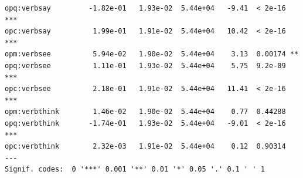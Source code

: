 \documentclass[10pt]{article}\usepackage[]{graphicx}\usepackage[dvipsnames]{xcolor}
\makeatletter
\newenvironment{kframe}{%
 \def\at@end@of@kframe{}%
 \ifinner\ifhmode%
  \def\at@end@of@kframe{\end{minipage}}%
  \begin{minipage}{\columnwidth}%
 \fi\fi%
 \def\FrameCommand##1{\hskip\@totalleftmargin \hskip-\fboxsep
 \colorbox{shadecolor}{##1}\hskip-\fboxsep
     \hskip-\linewidth \hskip-\@totalleftmargin \hskip\columnwidth}%
 \MakeFramed {\advance\hsize-\width
   \@totalleftmargin\z@ \linewidth\hsize
   \@setminipage}}%
 {\par\unskip\endMakeFramed%
 \at@end@of@kframe}
\newenvironment{knitrout}{}{} %
\makeatother
\begin{document}
\begin{knitrout}
\begin{kframe}
\begin{verbatim}
opq:verbsay         -1.82e-01   1.93e-02  5.44e+04   -9.41  < 2e-16 ***
opc:verbsay          1.99e-01   1.91e-02  5.44e+04   10.42  < 2e-16 ***
opm:verbsee          5.94e-02   1.90e-02  5.44e+04    3.13  0.00174 ** 
opq:verbsee          1.11e-01   1.93e-02  5.44e+04    5.75  9.2e-09 ***
opc:verbsee          2.18e-01   1.91e-02  5.44e+04   11.41  < 2e-16 ***
opm:verbthink        1.46e-02   1.90e-02  5.44e+04    0.77  0.44288    
opq:verbthink       -1.74e-01   1.93e-02  5.44e+04   -9.01  < 2e-16 ***
opc:verbthink        2.32e-03   1.91e-02  5.44e+04    0.12  0.90314    
---
Signif. codes:  0 '***' 0.001 '**' 0.01 '*' 0.05 '.' 0.1 ' ' 1
\end{verbatim}
\end{kframe}
\end{knitrout}


% 
% 
% 
% 
% 
% 
% 



\end{document}
